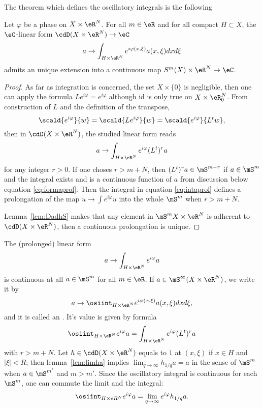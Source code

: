 The theorem which defines the oscillatory integrals is the following

\begin{theorem}
	Let $\varphi$ be a phase on $X\times\eR^N$. For all $m\in\eR$ and for all compact $H\subset X$, the $\eC$-linear form $\cdD(X\times\eR^N)\to\eC$
	\begin{equation}
		a\to \int_{H\times\eR^N}e^{i\varphi(x,\xi)}a(x,\xi)dxd\xi
	\end{equation}
	admits an unique extension into a continuous map $S^m(X)\times\eR^N\to\eC$.

\end{theorem}

\begin{proof}\label{eskdfml}
	As far as integration is concerned, the set $X\times\{ 0 \}$ is negligible, then one can apply the formula $Le^{i\varphi}=e^{i\varphi}$ although id is only true on $X\times\eR^N_0$. From construction of $L$ and the definition of the transpose,
	\[
		\scald{e^{i\varphi}}{w}=\scald{Le^{i\varphi}}{w}=\scald{e^{i\varphi}}{L^tw},
	\]
	then in $\cdD(X\times\eR^N)$, the studied linear form reads
	\begin{equation} \label{eq:intaprol}
		a\to\int_{H\times\eR^N}e^{i\varphi}(L^t)^ra
	\end{equation}
	for any integer $r>0$. If one choses $r>m+N$, then $(L^t)^ra\in\mS^{m-r}$ if $a\in\mS^m$ and the integral exists and is a continuous function of $a$ from discussion below equation \eqref{eq:formaprol}. Then the integral in equation \eqref{eq:intaprol} defines a prolongation of the map $u\to\int e^{i\varphi}u$ into the whole $\mS^m$ when $r>m+N$.

	Lemma~\ref{lem:DadhS} makes that any element in $\mS^mX\times\eR^N$ is adherent to $\cdD(X\times\eR^N)$, then a continuous prolongation is unique.

\end{proof}

The (prolonged) linear form
\[
	a\to\int_{H\times\eR^N}e^{i\varphi}a
\]
is continuous at all $a\in\mS^m$ for all $m\in\eR$. If $a\in\mS^{\infty}(X\times\eR^N)$, we write it by
\begin{equation}
	a\to \osiint_{H\times\eR^N}e^{i\varphi(x,\xi)}a(x,\xi)dxd\xi,
\end{equation}
and it is called an . It's value is given by formula
\[
	\osiint_{H\times\eR^N}e^{i\varphi}a=\int_{H\times\eR^N}e^{i\varphi}(L^t)^ra
\]
with $r>m+N$. Let $h\in\cdD(X\times\eR^N)$ equals to $1$ at $(x,\xi)$ if $x\in H$ and $| \xi |<R$; then lemma~\ref{lem:limha} implies $\lim_{q\to\infty}h_{1/q}a=a$ in the sense of $\mS^m$ when $a\in\mS^{m'}$ and $m>m'$. Since the oscillatory integral is continuous for each $\mS^m$, one can commute the limit and the integral:
\[
	\osiint_{H\times\\eR^N}e^{i\varphi}a=\lim_{q\to\infty}e^{i\varphi}h_{1/q}a.
\]

